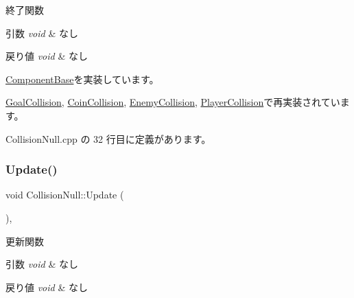 終了関数 


\begin{DoxyParams}{引数}
{\em void} & なし \\
\hline
\end{DoxyParams}

\begin{DoxyRetVals}{戻り値}
{\em void} & なし \\
\hline
\end{DoxyRetVals}


\mbox{\hyperlink{class_component_base_a9f42beaf0383d6f629819579cab4de57}{Component\+Base}}を実装しています。



\mbox{\hyperlink{class_goal_collision_ab818bad44ffcd595f1c495e659c0b348}{Goal\+Collision}}, \mbox{\hyperlink{class_coin_collision_aa852afdcdbedcf82809df9c7fd99be9e}{Coin\+Collision}}, \mbox{\hyperlink{class_enemy_collision_a2a194c606fd162db803c70c6fed9b9e4}{Enemy\+Collision}}, \mbox{\hyperlink{class_player_collision_aa1ab60a62fa2ae3231a1ea0bc8faf801}{Player\+Collision}}で再実装されています。



 Collision\+Null.\+cpp の 32 行目に定義があります。

\mbox{\label{class_collision_null_ad6ac0e9b06fcb4e3d19a5c3c1cadfe7e}} 
\subsubsection{\texorpdfstring{Update()}{Update()}}
{\footnotesize\ttfamily void Collision\+Null\+::\+Update (\begin{DoxyParamCaption}{ }\end{DoxyParamCaption})\hspace{0.3cm}{\ttfamily [override]}, {\ttfamily [virtual]}}



更新関数 


\begin{DoxyParams}{引数}
{\em void} & なし \\
\hline
\end{DoxyParams}

\begin{DoxyRetVals}{戻り値}
{\em void} & なし \\
\hline
\end{DoxyRetVals}


